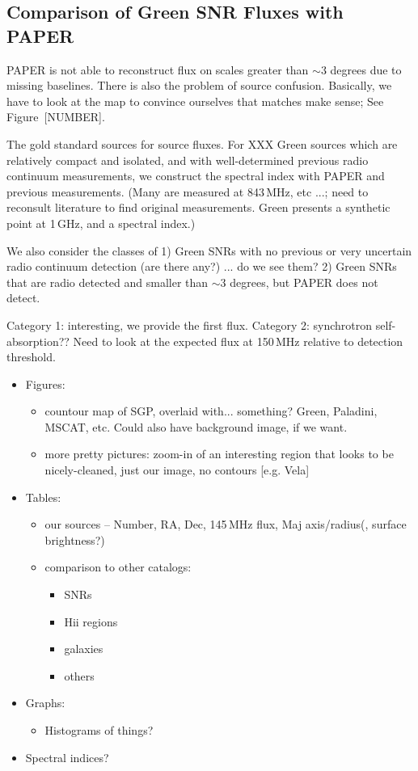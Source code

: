 \documentclass[useAMS,usenatbib]{mn2e}
\begin{document}
\subsection{Comparison of Green SNR Fluxes with PAPER}

PAPER is not able to reconstruct flux on scales greater than $\sim3$
degrees due to missing baselines.  There is also the problem of source
confusion.  Basically, we have to look at the map to convince
ourselves that matches make sense; See Figure~{\color{red}[NUMBER]}.

{\color{red} The gold standard sources for source fluxes.}
For XXX Green sources which are relatively compact
and isolated, and with well-determined previous radio continuum
measurements, we construct the spectral index with PAPER and previous
measurements.  (Many are measured at 843\,MHz, etc ...; need to
reconsult literature to find original measurements.  Green presents a
synthetic point at 1\,GHz, and a spectral index.)

We also consider the classes of 1) Green SNRs with no previous or very
uncertain radio continuum detection (are there any?) ... do we see
them?  2) Green SNRs that are radio detected and smaller than $\sim3$
degrees, but PAPER does not detect.

Category 1: interesting, we provide the first flux.  Category 2:
synchrotron self-absorption??  Need to look at the expected flux at
150\,MHz relative to detection threshold.  


\begin{itemize}
\item Figures:
\begin{itemize}
	\item countour map of SGP, overlaid with... something? Green, Paladini, MSCAT, etc. Could also have background image, if we want.
	\item more pretty pictures: zoom-in of an interesting region that looks to be nicely-cleaned, just our image, no contours [e.g. Vela]
\end{itemize}
\item Tables: 
	\begin{itemize}
	\item our sources -- Number, RA, Dec, 145\,MHz flux, Maj axis/radius(, surface brightness?)
	\item comparison to other catalogs:
		\begin{itemize}
		\item SNRs
		\item H{\sc ii} regions
		\item galaxies
		\item others
		\end{itemize}
	\end{itemize}	
\item Graphs:
	\begin{itemize}
	\item Histograms of things?
	\end{itemize}
\item Spectral indices?
\end{itemize}
\end{document}
